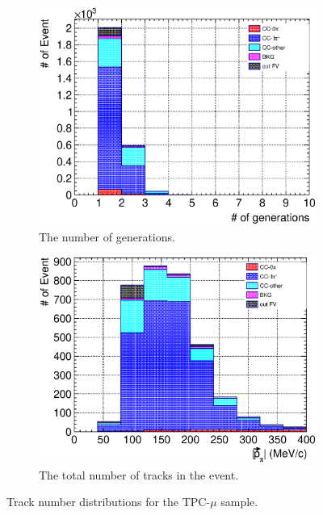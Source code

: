 \begin{figure}
\begin{subfigure}{\dbfigwid\textwidth}
       \includegraphics[width=\textwidth]{figures/sel/TPCmu_ngen_stack_al8.eps}
       \caption{The number of generations.}
       \label{subfig:tlpi-trknum-gen}
  \end{subfigure}
  \begin{subfigure}{\dbfigwid\textwidth}
       \includegraphics[width=\textwidth]{figures/sel/TPCmu_p_pi_stack_al8.eps}
       \caption{The total number of tracks in the event.}
       \label{subfig:tlpi-trknum-ppi}
  \end{subfigure}
  \caption{Track number distributions for the TPC-$\mu$ sample.}
  \label{fig:tlpi-trknum-tpcmu}
\end{figure}

